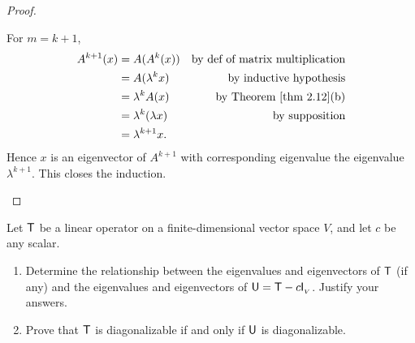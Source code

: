 \begin{proof}
\begin{enumerate}
For \(m = k + 1\),
\begin{align*}
    A^{k + 1}(x) & = A(A^k(x)) & \text{by def of matrix multiplication} \\
            & = A(\lambda^k x) & \text{by inductive hypothesis} \\
            & = \lambda^k A(x) & \text{by \THM{2.12}(b)} \\
            & = \lambda^k (\lambda x) & \text{by supposition} \\
            & = \lambda^{k + 1} x.
\end{align*}
Hence \(x\) is an eigenvector of \(A^{k + 1}\) with corresponding eigenvalue the eigenvalue \(\lambda^{k + 1}\).
This closes the induction.
\end{enumerate}
\end{proof}

\begin{exercise} \label{exercise 5.1.17}
Let \(\textsf{T}\) be a linear operator on a finite-dimensional vector space \(V\), and let \(c\) be any scalar.
\begin{enumerate}
\item Determine the relationship between the eigenvalues and eigenvectors of \(\textsf{T}\) (if any) and the eigenvalues and eigenvectors of \(\textsf{U} = \textsf{T} - c \textsf{I}_{_V}{}\).
Justify your answers.
\item Prove that \(\textsf{T}\) is diagonalizable if and only if \(\textsf{U}\) is diagonalizable.
\end{enumerate}
\end{exercise}


